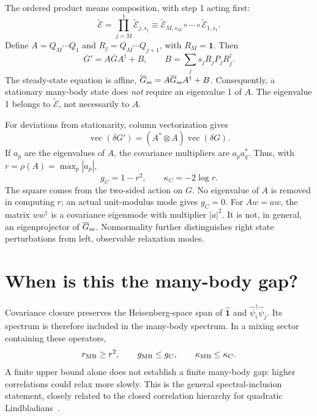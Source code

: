 \documentclass[aps,prb,twocolumn,nofootinbib,superscriptaddress]{revtex4-2}
\newcommand{\Id}{\hat{\mathbf{1}}}
\newcommand{\id}{\mathbf{1}}
\newcommand{\E}{\widetilde{\mathcal E}}
\begin{document}
The ordered product means composition, with step 1 acting first:
\begin{equation}
 \E=\prod_{j=M}^{1}\E_{j,s_j}
 \equiv\E_{M,s_M}\circ\cdots\circ\E_{1,s_1}.
\end{equation}
Define $A=Q_M\cdots Q_1$ and $R_j=Q_M\cdots Q_{j+1}$, with
$R_M=\id$. Then
\begin{equation}
 \overline G'=A\overline GA^\dagger+B,
 \qquad B=\sum_j s_jR_jP_jR_j^\dagger.\label{eq:affine}
\end{equation}
The steady-state equation is affine,
$\overline G_{\rm ss}=A\overline G_{\rm ss}A^\dagger+B$.
Consequently, a stationary many-body state does \emph{not} require an
eigenvalue 1 of $A$. The eigenvalue 1 belongs to $\E$, not necessarily to $A$.

For deviations from stationarity, column vectorization gives
\begin{equation}
 \operatorname{vec}(\delta G')=(A^*\otimes A)\operatorname{vec}(\delta G).
\end{equation}
If $a_p$ are the eigenvalues of $A$, the covariance multipliers are
$a_pa_q^*$. Thus, with $r=\rho(A)=\max_p|a_p|$,
\begin{equation}
 \boxed{g_C=1-r^2,\qquad\kappa_C=-2\log r.}\label{eq:covgap}
\end{equation}
The square comes from the two-sided action on $G$. No eigenvalue of $A$
is removed in computing $r$; an actual unit-modulus mode gives $g_C=0$.
For $Aw=aw$, the matrix $ww^\dagger$ is a covariance eigenmode with
multiplier $|a|^2$. It is not, in general, an eigenprojector of
$\overline G_{\rm ss}$. Nonnormality further distinguishes right state
perturbations from left, observable relaxation modes.

\section{When is this the many-body gap?}
Covariance closure preserves the Heisenberg-space span of $\Id$ and
$\hat\psi_i^\dagger\hat\psi_j$. Its spectrum is therefore included in
the many-body spectrum. In a mixing sector containing these operators,
\begin{equation}
 r_{\rm MB}\ge r^2,\qquad
 g_{\rm MB}\le g_C,\qquad\kappa_{\rm MB}\le\kappa_C.
 \label{eq:bound}
\end{equation}
A finite upper bound alone does not establish a finite many-body gap:
higher correlations could relax more slowly. This is the general
spectral-inclusion statement, closely related to the closed correlation
hierarchy for quadratic Lindbladians~\cite{BZ}.
\end{document}
